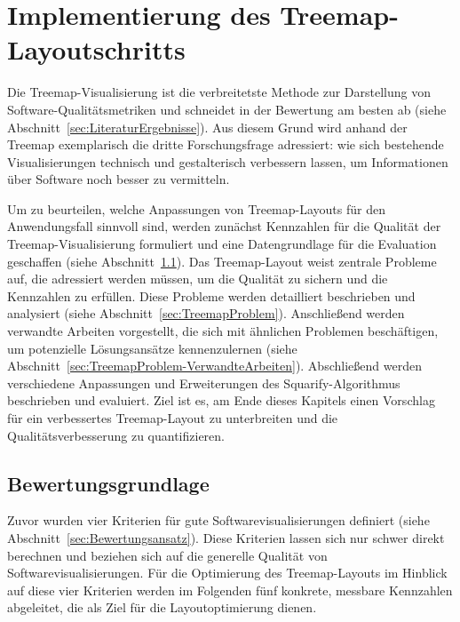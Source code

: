 \chapter{Implementierung des Treemap-Layoutschritts} \label{sec:VerbesserungSquarify}

Die Treemap-Visualisierung ist die verbreitetste Methode zur Darstellung von Software-Qualitätsmetriken und schneidet in der Bewertung am besten ab (siehe Abschnitt~\ref{sec:LiteraturErgebnisse}). Aus diesem Grund wird anhand der Treemap exemplarisch die dritte Forschungsfrage adressiert: wie sich bestehende Visualisierungen technisch und gestalterisch verbessern lassen, um Informationen über Software noch besser zu vermitteln.

Um zu beurteilen, welche Anpassungen von Treemap-Layouts für den Anwendungsfall sinnvoll sind, werden zunächst Kennzahlen für die Qualität der Treemap-Visualisierung formuliert und eine Datengrundlage für die Evaluation geschaffen (siehe Abschnitt~\ref{sec:Bewertungsgrundlage}). Das Treemap-Layout weist zentrale Probleme auf, die adressiert werden müssen, um die Qualität zu sichern und die Kennzahlen zu erfüllen. Diese Probleme werden detailliert beschrieben und analysiert (siehe Abschnitt~\ref{sec:TreemapProblem}). Anschließend werden verwandte Arbeiten vorgestellt, die sich mit ähnlichen Problemen beschäftigen, um potenzielle Lösungsansätze kennenzulernen (siehe Abschnitt~\ref{sec:TreemapProblem-VerwandteArbeiten}). Abschließend werden verschiedene Anpassungen und Erweiterungen des Squarify-Algorithmus beschrieben und evaluiert. Ziel ist es, am Ende dieses Kapitels einen Vorschlag für ein verbessertes Treemap-Layout zu unterbreiten und die Qualitätsverbesserung zu quantifizieren.

\section{Bewertungsgrundlage} \label{sec:Bewertungsgrundlage}

Zuvor wurden vier Kriterien für gute Softwarevisualisierungen definiert (siehe Abschnitt~\ref{sec:Bewertungsansatz}). Diese Kriterien lassen sich nur schwer direkt berechnen und beziehen sich auf die generelle Qualität von Softwarevisualisierungen. Für die Optimierung des Treemap-Layouts im Hinblick auf diese vier Kriterien werden im Folgenden fünf konkrete, messbare Kennzahlen abgeleitet, die als Ziel für die Layoutoptimierung dienen.


